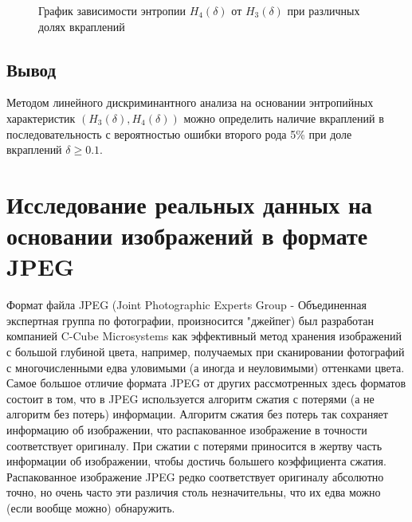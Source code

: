 ﻿\documentclass[a4paper,12pt]{article}
\theoremstyle{plain}
\begin{document}
	\begin{figure}[h]
		\caption{График зависимости энтропии $H_4{(\delta)}$ от $H_3{(\delta)}$ при различных долях вкраплений}
		\label{ris:"lda.png"}
	\end{figure}
	\newpage
\subsection{Вывод}
Методом линейного дискриминантного анализа на основании энтропийных характеристик $(H_3(\delta), H_4(\delta))$ можно определить наличие вкраплений в последовательность с вероятностью ошибки второго рода 5\% при доле вкраплений $\delta \geq 0.1$.





\clearpage
\newpage
\section{Исследование реальных данных на основании изображений в формате JPEG}
Формат файла JPEG (Joint Photographic Experts Group - Объединенная экспертная группа по фотографии, произносится "джейпег) был разработан компанией C-Cube Microsystems как эффективный метод хранения изображений с большой глубиной цвета, например, получаемых при сканировании фотографий с многочисленными едва уловимыми (а иногда и неуловимыми) оттенками цвета. Самое большое отличие формата JPEG от других рассмотренных здесь форматов состоит в том, что в JPEG используется алгоритм сжатия с потерями (а не алгоритм без потерь) информации. Алгоритм сжатия без потерь так сохраняет информацию об изображении, что распакованное изображение в точности соответствует оригиналу. При сжатии с потерями приносится в жертву часть информации об изображении, чтобы достичь большего коэффициента сжатия. Распакованное изображение JPEG редко соответствует оригиналу абсолютно точно, но очень часто эти различия столь незначительны, что их едва можно (если вообще можно) обнаружить.
\end{document}
